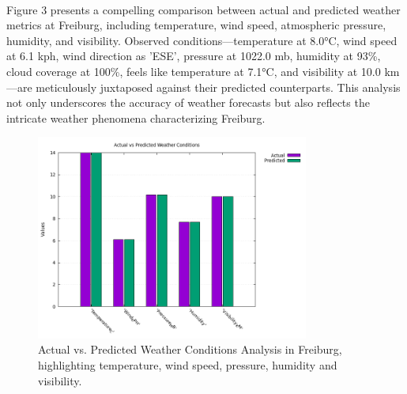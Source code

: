 \documentclass[11pt]{article}
\begin{document}
\paragraph{}Figure 3 presents a compelling comparison between actual and predicted weather metrics at Freiburg, including temperature, wind speed, atmospheric pressure, humidity, and visibility. Observed conditions—temperature at 8.0°C, wind speed at 6.1 kph, wind direction as 'ESE', pressure at 1022.0 mb, humidity at 93\%, cloud coverage at 100\%, feels like temperature at 7.1°C, and visibility at 10.0 km—are meticulously juxtaposed against their predicted counterparts. This analysis not only underscores the accuracy of weather forecasts but also reflects the intricate weather phenomena characterizing Freiburg.
\begin{figure}[h]
\centering
\includegraphics[width=0.8\textwidth]{data/graph/weather_comparison_graph.png}
\caption{Actual vs. Predicted Weather Conditions Analysis in Freiburg, highlighting temperature, wind speed, pressure, humidity and visibility.}
\end{figure}
\end{document}
